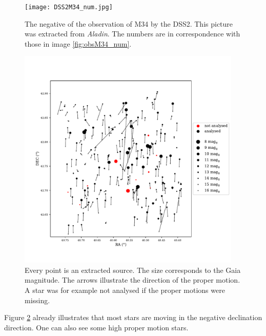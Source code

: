 \documentclass{article}
\begin{document}
\begin{figure}[H]
  \centering
    \texttt{[image: DSS2M34\_num.jpg]}
  \caption{The negative of the observation of M34 by the DSS2. This picture was extracted from \textit{Aladin}. The numbers are in correspondence with those in image \ref{fig:obsM34_num}.}
  \label{fig:DSS2M34_num}
\end{figure}

\begin{figure}[H]
  \centering
    \includegraphics[trim={0 1.6cm 0 2.3cm},clip, width=0.95\textwidth]{M34_pm.pdf}
  \caption{Every point is an extracted source. The size corresponds to the Gaia magnitude. The arrows illustrate the direction of the proper motion. A star was for example not analysed if the proper motions were missing.}
  \label{fig:M34_pm}
\end{figure}

Figure \ref{fig:M34_pm} already illustrates that most stars are moving in the negative declination direction. One can also see some high proper motion stars.
\end{document}

